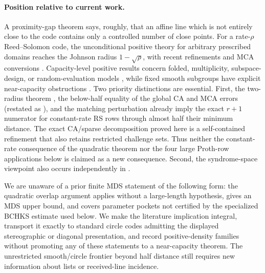 \documentclass[11pt,a4paper]{amsart}
\numberwithin{equation}{section}
\theoremstyle{remark}
\begin{document}
\paragraph{Position relative to current work.}
A proximity-gap theorem says, roughly, that an affine line which is not
entirely close to the code contains only a controlled number of close
points.  For a rate-\(\rho\) Reed--Solomon code, the unconditional
positive theory for arbitrary prescribed domains reaches the Johnson
radius \(1-\sqrt{\rho}\), with recent refinements and MCA conversions
\cite{BCIKS20,BCHKS25,BordageChiesaGuanManzur25,Habock25}.  Capacity-level positive results concern
folded, multiplicity, subspace-design, or random-evaluation models
\cite{GoyalGuruswami25,GoyalGuruswamiSunWootters26}, while fixed smooth
subgroups have explicit near-capacity obstructions
\cite{CS25,KKH26,Kambire26}.  Two priority distinctions are essential.
First, the two-radius theorem \cite[Thm.~1.3]{BCHKS25}, the below-half
equality of the global CA and MCA errors
\cite[Lem.~4.10]{WHIR} (restated as \cite[Lem.~4.6]{ABF26}), and the
matching perturbation already imply the exact \(r+1\) numerator for
constant-rate RS rows through almost half their minimum distance.  The
exact CA/sparse decomposition proved here is a self-contained refinement
that also retains restricted challenge sets.  Thus neither the
constant-rate consequence of the quadratic theorem nor the four large
Proth-row applications below is claimed as a new consequence.  Second, the
syndrome-space viewpoint also occurs independently in \cite{YuanZhu26}.

We are unaware of a prior finite MDS statement of the following form: the
quadratic overlap argument applies without a large-length hypothesis,
gives an MDS upper bound, and covers parameter pockets not certified by
the specialized BCHKS estimate used below.  We make the literature implication integral,
transport it exactly to standard circle codes admitting the displayed
stereographic or diagonal presentation, and record positive-density
families without promoting any of these statements to a near-capacity
theorem.  The unrestricted smooth/circle frontier beyond half distance
still requires new information about lists or received-line incidence.
\end{document}
